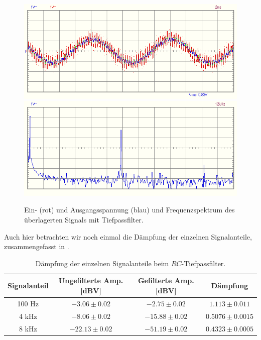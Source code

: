 \begin{figure}[H]
  \centering
  \includegraphics[width=.8\textwidth]{files/aufgabe8_teil2_tiefpass_oszi.png}
  \includegraphics[width=.8\textwidth]{files/aufgabe8_teil2_tiefpass_spectrum.png}
  \caption{Ein- (rot) und Ausgangsspannung (blau) und Frequenzspektrum des überlagerten Signals mit Tiefpassfilter.}
  \label{fig:aufgabe8_teil2_tiefpass}
\end{figure}

Auch hier betrachten wir noch einmal die Dämpfung der einzelnen Signalanteile, zusammengefasst in .

\begin{table}[H]
  \centering
  \caption{Dämpfung der einzelnen Signalanteile beim $RC$-Tiefpassfilter.}
  \vspace*{1em}
  \label{tab:dmpf_tiefpass}
  \begin{tabular}{c|c|c|c}
    Signalanteil & Ungefilterte Amp. [dBV] & Gefilterte Amp. [dBV] & Dämpfung\\\hline
    100 Hz & $-3.06 \pm 0.02$ & $-2.75 \pm 0.02$ & $1.113 \pm 0.011$\\
    4 kHz & $-8.06 \pm 0.02$ & $-15.88 \pm 0.02$ & $0.5076 \pm 0.0015$\\
    8 kHz & $-22.13 \pm 0.02$ & $-51.19 \pm 0.02$ & $0.4323 \pm 0.0005$
  \end{tabular}
\end{table}


